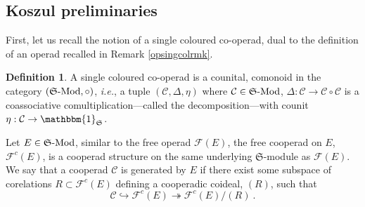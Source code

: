 \documentclass[11pt]{amsart}
\numberwithin{equation}{section}
\newtheorem{prop}[theo]{Proposition}
\theoremstyle{definition}
\newtheorem{defn}[theo]{Definition}
\newcommand{\bb}{\mathbb}
\newcommand{\mc}{\mathcal}
\newcommand{\mf}{\mathfrak}
\newcommand{\N}{{\mathbb{N}}}
\DeclareMathOperator{\Hom}{Hom}
\DeclareMathOperator{\Vect}{Vect}
\newcommand{\Mod}{{\textup{-Mod}}}
\newcommand{\K}{{\bb K}}
\newcommand{\ik}{{\bb K}}
\newcommand{\im}{{\textup{im}}}
\newcommand{\Coop}{{\textup{CoOp}}}
\newcommand{\Ss}{{{\mf{S}}}}
\newcommand{\CC}{{\textup{CC}}}
\newcommand{\0}{{\textbf{0}}}
\newcommand{\id}{{\textup{id}}}
\newcommand{\DGVect}{\textup{DGVect}}
\def\CC{{\mc C}}
\def\FF{{\mc F}}
\def \mf{\mathfrak}
\def \id{\mathbbm{1}}
\def \ie{{\it i.e.}}
\begin{document}
\subsection{Koszul preliminaries}

First, let us recall the notion of a single coloured co-operad, dual to the definition of an operad recalled in Remark \ref{opsingcolrmk}.
\begin{defn}
	A single coloured co-operad is a counital, comonoid in the category $(\Ss\Mod,\circ)$, \ie, a tuple $(\CC, \Delta,\eta)$ where $\CC\in \Ss\Mod$, $\Delta: \CC\rightarrow \CC\circ \CC$ is a coassociative comultiplication---called the decomposition---with counit $\eta: \CC\rightarrow \id_\Ss$.


\end{defn}
Let $E\in \Ss\Mod$, similar to the free operad $\FF(E)$, the free cooperad on $E$, $\FF^c(E)$, is a cooperad structure on the same underlying $\Ss$-module as $\FF(E)$. We say that a cooperad $\CC$ is generated by $E$ if there exist some subspace of corelations $R\subset \FF^c(E)$ defining a cooperadic coideal, $(R)$, such that
\[
\CC \hookrightarrow \FF^c(E)\twoheadrightarrow \FF^c(E)/(R)~.
\]



%
\end{document}
